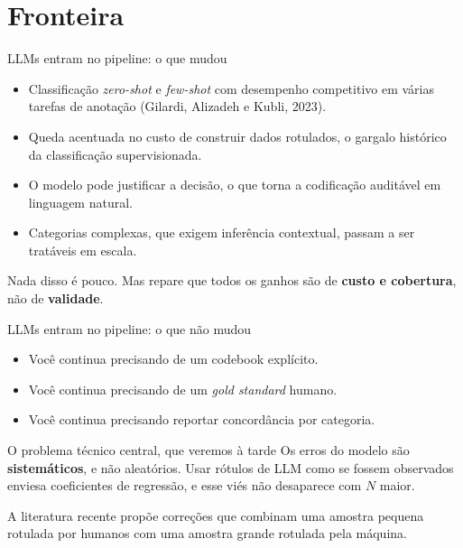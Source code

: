 \documentclass[11pt,aspectratio=169]{beamer}
\begin{document}
\section{Fronteira}

\begin{frame}{LLMs entram no pipeline: o que mudou}
\begin{itemize}
  \item Classificação \emph{zero-shot} e \emph{few-shot} com desempenho
        competitivo em várias tarefas de anotação (Gilardi, Alizadeh e Kubli,
        2023).
  \vspace{0.1cm}
  \item Queda acentuada no custo de construir dados rotulados, o gargalo
        histórico da classificação supervisionada.
  \vspace{0.1cm}
  \item O modelo pode justificar a decisão, o que torna a codificação auditável
        em linguagem natural.
  \vspace{0.1cm}
  \item Categorias complexas, que exigem inferência contextual, passam a ser
        tratáveis em escala.
\end{itemize}
\pause
\vspace{0.35cm}
\centering
\small Nada disso é pouco. Mas repare que todos os ganhos são de
\textbf{custo e cobertura}, não de \textbf{validade}.
\end{frame}

\begin{frame}{LLMs entram no pipeline: o que não mudou}
\begin{itemize}
  \item Você continua precisando de um codebook explícito.
  \item Você continua precisando de um \emph{gold standard} humano.
  \item Você continua precisando reportar concordância por categoria.
\end{itemize}
\vspace{0.35cm}
\begin{alertblock}{O problema técnico central, que veremos à tarde}
Os erros do modelo são \textbf{sistemáticos}, e não aleatórios. Usar rótulos de
LLM como se fossem observados enviesa coeficientes de regressão, e esse viés não
desaparece com $N$ maior.
\end{alertblock}
\vspace{0.3cm}
\centering
\small A literatura recente propõe correções que combinam uma amostra pequena
rotulada por humanos com uma amostra grande rotulada pela máquina.
\end{frame}
\end{document}
